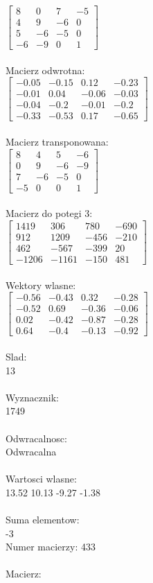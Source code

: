 \documentclass[a4paper,12pt]{article}
\begin{document}
$\begin{bmatrix} 8&0&7&-5\\4&9&-6&0\\5&-6&-5&0\\-6&-9&0&1 \end{bmatrix}$
\\
\\
Macierz odwrotna:\\

$\begin{bmatrix} -0.05&-0.15&0.12&-0.23\\-0.01&0.04&-0.06&-0.03\\-0.04&-0.2&-0.01&-0.2\\-0.33&-0.53&0.17&-0.65 \end{bmatrix}$
\\
\\
Macierz transponowana:\\

$\begin{bmatrix} 8&4&5&-6\\0&9&-6&-9\\7&-6&-5&0\\-5&0&0&1 \end{bmatrix}$
\\
\\
Macierz do potegi 3:\\

$\begin{bmatrix} 1419&306&780&-690\\912&1209&-456&-210\\462&-567&-399&20\\-1206&-1161&-150&481 \end{bmatrix}$
\\
\\
Wektory wlasne:\\

$\begin{bmatrix} -0.56&-0.43&0.32&-0.28\\-0.52&0.69&-0.36&-0.06\\0.02&-0.42&-0.87&-0.28\\0.64&-0.4&-0.13&-0.92 \end{bmatrix}$
\\
\\
Slad:\\
13
\\
\\
Wyznacznik:\\
1749
\\
\\
Odwracalnosc:\\
Odwracalna
\\
\\
Wartosci wlasne:\\
13.52 10.13 -9.27 -1.38
\\
\\
Suma elementow:\\
-3
\\
\newpage
Numer macierzy:
433
\\
\\
Macierz:\\
\end{document}
